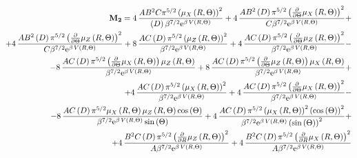 \begin{equation*}
\begin{aligned}
\mathbf{M_2} = 4\,{\frac {A{B}^{2}C{\pi }^{5/2} \left( \mu_{{X}} \left( R,\Theta
 \right)  \right) ^{2}}{ \left( D \right) {\beta}^{7/2}{{\rm e}^{\beta
\,V \left( R,\Theta \right) }}}}+4\,{\frac {A{B}^{2} \left( D \right) 
{\pi }^{5/2} \left( {\frac {\partial }{\partial \Theta}}\mu_{{X}}
 \left( R,\Theta \right)  \right) ^{2}}{C{\beta}^{7/2}{{\rm e}^{\beta
\,V \left( R,\Theta \right) }}}}+ \\
+ 4\,{\frac {A{B}^{2} \left( D \right) 
{\pi }^{5/2} \left( {\frac {\partial }{\partial \Theta}}\mu_{{Z}}
 \left( R,\Theta \right)  \right) ^{2}}{C{\beta}^{7/2}{{\rm e}^{\beta
\,V \left( R,\Theta \right) }}}}  +8\,{\frac {AC \left( D \right) {\pi }
^{5/2} \left( \mu_{{Z}} \left( R,\Theta \right)  \right) ^{2}}{{\beta}
^{7/2}{{\rm e}^{\beta\,V \left( R,\Theta \right) }}}}+4\,{\frac {AC
 \left( D \right) {\pi }^{5/2} \left( {\frac {\partial }{\partial 
\Theta}}\mu_{{Z}} \left( R,\Theta \right)  \right) ^{2}}{{\beta}^{7/2}
{{\rm e}^{\beta\,V \left( R,\Theta \right) }}}}- \\
-8\,{\frac {AC \left( D
 \right) {\pi }^{5/2} \left( {\frac {\partial }{\partial \Theta}}\mu_{
{X}} \left( R,\Theta \right)  \right) \mu_{{Z}} \left( R,\Theta
 \right) }{{\beta}^{7/2}{{\rm e}^{\beta\,V \left( R,\Theta \right) }}}
}+ 8\,{\frac {AC \left( D \right) {\pi }^{5/2} \left( {\frac {\partial 
}{\partial \Theta}}\mu_{{Z}} \left( R,\Theta \right)  \right) \mu_{{X}
} \left( R,\Theta \right) }{{\beta}^{7/2}{{\rm e}^{\beta\,V \left( R,
\Theta \right) }}}} + \\
+ 4\,{\frac {AC \left( D \right) {\pi }^{5/2}
 \left( \mu_{{X}} \left( R,\Theta \right)  \right) ^{2}}{{\beta}^{7/2}
{{\rm e}^{\beta\,V \left( R,\Theta \right) }}}} + 4\,{\frac {AC \left( D
 \right) {\pi }^{5/2} \left( {\frac {\partial }{\partial \Theta}}\mu_{
{X}} \left( R,\Theta \right)  \right) ^{2}}{{\beta}^{7/2}{{\rm e}^{
\beta\,V \left( R,\Theta \right) }}}}- \\
- 8\,{\frac {AC \left( D \right) {
\pi }^{5/2}\mu_{{X}} \left( R,\Theta \right) \mu_{{Z}} \left( R,\Theta
 \right) \cos \left( \Theta \right) }{{\beta}^{7/2}{{\rm e}^{\beta\,V
 \left( R,\Theta \right) }}\sin \left( \Theta \right) }}+4\,{\frac {AC
 \left( D \right) {\pi }^{5/2} \left( \mu_{{X}} \left( R,\Theta
 \right)  \right) ^{2} \left( \cos \left( \Theta \right)  \right) ^{2}
}{{\beta}^{7/2}{{\rm e}^{\beta\,V \left( R,\Theta \right) }} \left( 
\sin \left( \Theta \right)  \right) ^{2}}}+ \\
+ 4\,{\frac {{B}^{2}C \left( 
D \right) {\pi }^{5/2} \left( {\frac {\partial }{\partial R}}\mu_{{Z}}
 \left( R,\Theta \right)  \right) ^{2}}{A{\beta}^{7/2}{{\rm e}^{\beta
\,V \left( R,\Theta \right) }}}}+4\,{\frac {{B}^{2}C \left( D \right) 
{\pi }^{5/2} \left( {\frac {\partial }{\partial R}}\mu_{{X}} \left( R,
\Theta \right)  \right) ^{2}}{A{\beta}^{7/2}{{\rm e}^{\beta\,V \left( 
R,\Theta \right) }}}}
\end{aligned}
\end{equation*}

